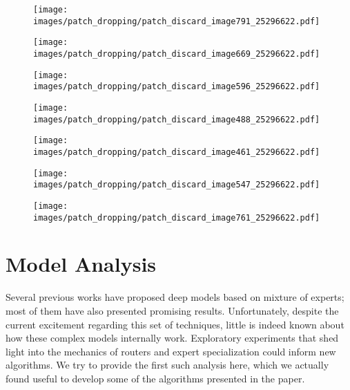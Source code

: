 \documentclass{article}
\begin{document}
\begin{figure}[h]
\centering
\texttt{[image: images/patch\_dropping/patch\_discard\_image791\_25296622.pdf]}

\centering
\texttt{[image: images/patch\_dropping/patch\_discard\_image669\_25296622.pdf]}

\centering
\texttt{[image: images/patch\_dropping/patch\_discard\_image596\_25296622.pdf]}

\centering
\texttt{[image: images/patch\_dropping/patch\_discard\_image488\_25296622.pdf]}

\centering
\texttt{[image: images/patch\_dropping/patch\_discard\_image461\_25296622.pdf]}

\centering
\texttt{[image: images/patch\_dropping/patch\_discard\_image547\_25296622.pdf]}

\centering
\texttt{[image: images/patch\_dropping/patch\_discard\_image761\_25296622.pdf]}

\end{figure} \clearpage
\section{Model Analysis}
\label{app_analysis}

Several previous works have proposed deep models based on mixture of experts; most of them have also presented promising results.
Unfortunately, despite the current excitement regarding this set of techniques, little is indeed known about how these complex models internally work.
Exploratory experiments that shed light into the mechanics of routers and expert specialization could inform new algorithms.
We try to provide the first such analysis here, which we actually found useful to develop some of the algorithms presented in the paper.
\end{document}
